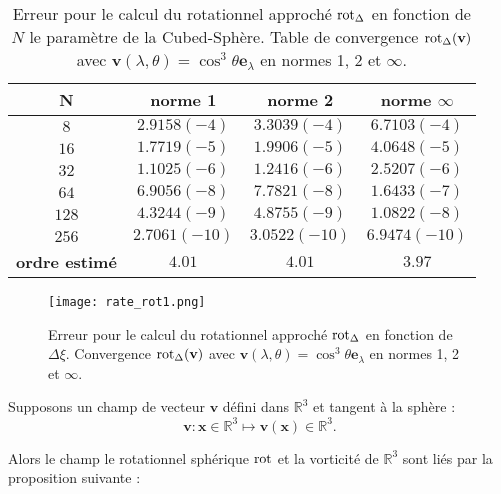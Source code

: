 \begin{table}[htbp]
\begin{center}
\begin{tabular}{|c||c|c|c|}
\hline
\textbf{N}  & \textbf{norme 1} & \textbf{norme 2} & \textbf{norme $\infty$} \\
\hline
\hline
$8$  & $2.9158(-4)$  & $3.3039(-4)$  & $6.7103(-4)$  \\
$16$ & $1.7719(-5)$  & $1.9906(-5)$  & $4.0648(-5)$  \\
$32$ & $1.1025(-6)$  & $1.2416(-6)$  & $2.5207(-6)$  \\
$64$ & $6.9056(-8)$  & $7.7821(-8)$  & $1.6433(-7)$  \\
$128$& $4.3244(-9)$  & $4.8755(-9)$  & $1.0822(-8)$  \\
$256$& $2.7061(-10)$ & $3.0522(-10)$ & $6.9474(-10)$ \\
\hline 
\hline
\textbf{ordre estimé}& $4.01$ & $4.01$ & $3.97$\\
\hline
\end{tabular}
\end{center}
\caption{Erreur pour le calcul du rotationnel approché $\text{rot}_{\Delta}$ en fonction de $N$ le paramètre de la Cubed-Sphère. Table de convergence $\text{rot}_{\Delta} ( \mathbf{v} )$ avec $\mathbf{v} ( \lambda, \theta ) = \cos^3 \theta \mathbf{e}_{\lambda}$ en normes 1, 2 et $\infty$.}
\label{tab:rate_rot1}
\end{table} 

\begin{figure}[htbp]
\begin{center}
\texttt{[image: rate\_rot1.png]}
\end{center}
\caption{Erreur pour le calcul du rotationnel approché $\text{rot}_{\Delta}$ en fonction de $\Delta \xi$. Convergence $\text{rot}_{\Delta} ( \mathbf{v} )$ avec $\mathbf{v} ( \lambda, \theta ) = \cos^3 \theta \mathbf{e}_{\lambda}$ en normes 1, 2 et $\infty$.}
\label{fig:rate_rot1}
\end{figure}


Supposons un champ de vecteur $\mathbf{v}$ défini dans $\mathbb{R}^3$ et tangent à la sphère :
\begin{equation}
\mathbf{v} : \mathbf{x} \in \mathbb{R}^3 \mapsto \mathbf{v}(\mathbf{x}) \in \mathbb{R}^3.
\end{equation}

Alors le champ le rotationnel sphérique $\text{rot}$ et la vorticité de $\mathbb{R}^3$ sont liés par la proposition suivante :

